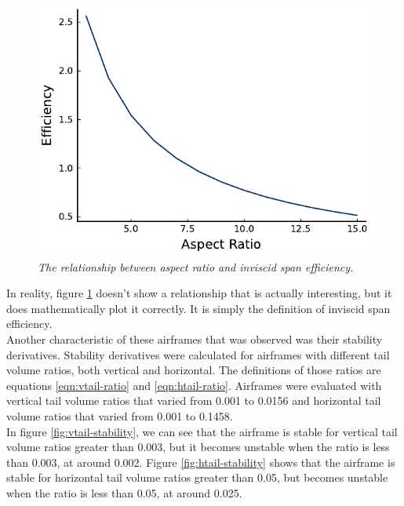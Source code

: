 \documentclass[journal]{new-aiaa}
\begin{document}
	\begin{figure}[H]
		\centering
		\includegraphics{../graphics/efficiency.pdf}
		\caption{\emph{The relationship between aspect ratio and inviscid span efficiency.}}
		\label{fig:efficiency}
	\end{figure}
	
	In reality, figure \ref{fig:efficiency} doesn't show a relationship that is actually interesting, but it does mathematically plot it correctly. It is simply the definition of inviscid span efficiency.\\
	
	Another characteristic of these airframes that was observed was their stability derivatives. Stability derivatives were calculated for airframes with different tail volume ratios, both vertical and horizontal. The definitions of those ratios are equations \ref{eqn:vtail-ratio} and \ref{eqn:htail-ratio}. Airframes were evaluated with vertical tail volume ratios that varied from 0.001 to 0.0156 and horizontal tail volume ratios that varied from 0.001 to 0.1458.\\ 
	
	In figure \ref{fig:vtail-stability}, we can see that the airframe is stable for vertical tail volume ratios greater than 0.003, but it becomes unstable when the ratio is less than 0.003, at around 0.002. Figure \ref{fig:htail-stability} shows that the airframe is stable for horizontal tail volume ratios greater than 0.05, but becomes unstable when the ratio is less than 0.05, at around 0.025.\\
	
\end{document}
